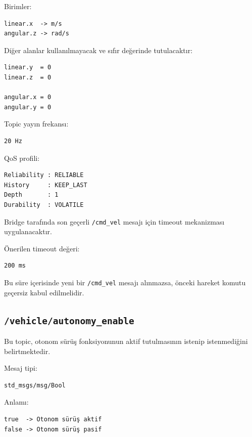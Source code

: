 \documentclass[12pt,a4paper]{article}
\begin{document}
Birimler:

\begin{verbatim}
linear.x  -> m/s
angular.z -> rad/s
\end{verbatim}

Diğer alanlar kullanılmayacak ve sıfır değerinde tutulacaktır:

\begin{verbatim}
linear.y  = 0
linear.z  = 0

angular.x = 0
angular.y = 0
\end{verbatim}

Topic yayın frekansı:

\begin{verbatim}
20 Hz
\end{verbatim}

QoS profili:

\begin{verbatim}
Reliability : RELIABLE
History     : KEEP_LAST
Depth       : 1
Durability  : VOLATILE
\end{verbatim}

Bridge tarafında son geçerli \texttt{/cmd\_vel} mesajı için timeout
mekanizması uygulanacaktır.

Önerilen timeout değeri:

\begin{verbatim}
200 ms
\end{verbatim}

Bu süre içerisinde yeni bir \texttt{/cmd\_vel} mesajı alınmazsa,
önceki hareket komutu geçersiz kabul edilmelidir.

\subsection{\texttt{/vehicle/autonomy\_enable}}

Bu topic, otonom sürüş fonksiyonunun aktif tutulmasının istenip
istenmediğini belirtmektedir.

Mesaj tipi:

\begin{verbatim}
std_msgs/msg/Bool
\end{verbatim}

Anlamı:

\begin{verbatim}
true  -> Otonom sürüş aktif
false -> Otonom sürüş pasif
\end{verbatim}
\end{document}
